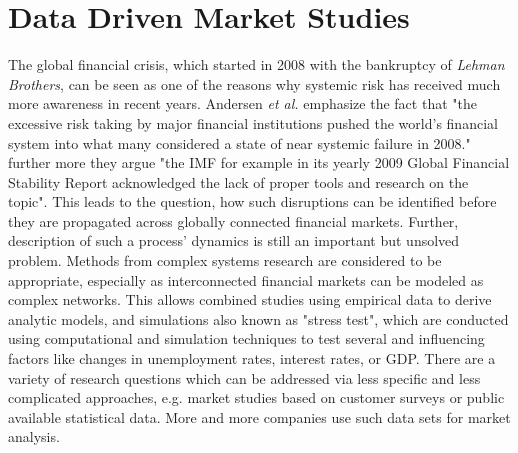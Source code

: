 \documentclass[a4paper,10pt]{scrbook}
\begin{document}






\chapter{Data Driven Market Studies}
\label{chap.DataDrivenMarketStudies}
%
The global financial crisis, which started in 2008 with the bankruptcy of \textit{Lehman Brothers}, can be seen as one of the reasons 
why systemic risk has received much more awareness in recent years. Andersen \textit{et al.} \cite{10.1371/journal.pone.0026472} emphasize the fact that "the excessive risk taking by major financial institutions pushed the world's financial system into what many considered a state of near systemic failure in 2008." further more they argue "the  IMF for example in its yearly 2009 Global Financial Stability Report acknowledged the lack of proper tools and research on the topic". This leads to the question, how such disruptions can be identified before they are propagated across globally connected financial markets. Further, description of such a process' dynamics is still an important but unsolved problem. Methods from complex systems research are considered to be appropriate, especially as interconnected financial markets can be modeled as complex networks. This allows combined studies using empirical data 
to derive analytic models, and simulations also known as "stress test", which are conducted using computational and simulation techniques to test several and influencing factors like changes in unemployment rates, interest rates, or  GDP. There are a variety of research questions which can be addressed via less specific and less complicated approaches, e.g. market studies based on customer surveys or public available statistical data. More and more companies use such data sets for market analysis. 
\end{document}
